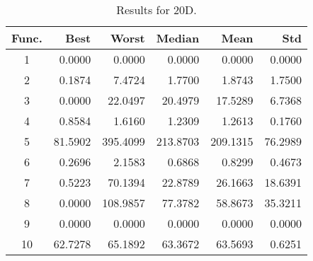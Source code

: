 \begin{table}[ht]
\centering
\caption{ Results for 20D. }
\label{tab:20D}
\begin{tabular}{crrrrr}
\hline
{Func.} & Best & Worst & Median & Mean & Std \\
\hline
1 & 0.0000 & 0.0000 & 0.0000 & 0.0000 & 0.0000 \\
2 & 0.1874 & 7.4724 & 1.7700 & 1.8743 & 1.7500 \\
3 & 0.0000 & 22.0497 & 20.4979 & 17.5289 & 6.7368 \\
4 & 0.8584 & 1.6160 & 1.2309 & 1.2613 & 0.1760 \\
5 & 81.5902 & 395.4099 & 213.8703 & 209.1315 & 76.2989 \\
6 & 0.2696 & 2.1583 & 0.6868 & 0.8299 & 0.4673 \\
7 & 0.5223 & 70.1394 & 22.8789 & 26.1663 & 18.6391 \\
8 & 0.0000 & 108.9857 & 77.3782 & 58.8673 & 35.3211 \\
9 & 0.0000 & 0.0000 & 0.0000 & 0.0000 & 0.0000 \\
10 & 62.7278 & 65.1892 & 63.3672 & 63.5693 & 0.6251 \\
\hline
\end{tabular}
\end{table}
